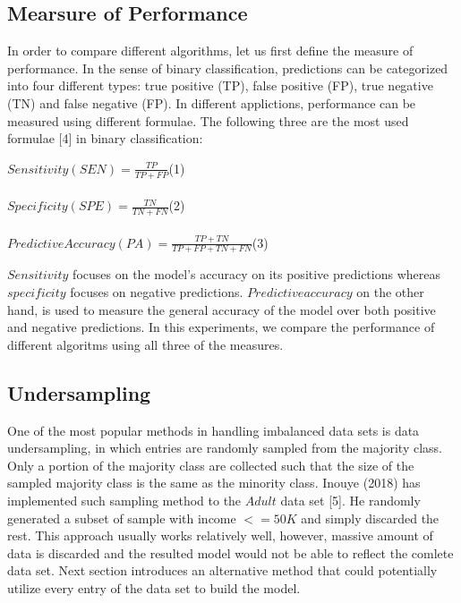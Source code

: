 \documentclass{article}
\begin{document}
\subsection{Mearsure of Performance}
\label{measure_of_performance}

In order to compare different algorithms, let us first define the measure of performance. In the sense of binary classification, predictions can be categorized into four different types: true positive (TP), false positive (FP), true negative (TN) and false negative (FP). In different applictions, performance can be measured using different formulae. The following three are the most used formulae [4] in binary classification:\\
\begin{center}
\hfill$Sensitivity (SEN)=\frac{TP}{TP+FP}$\hfill (1)\\\hfill\\
\hfill$Specificity (SPE)=\frac{TN}{TN+FN}$\hfill (2)\\\hfill\\
\hfill$Predictive Accuracy (PA)=\frac{TP+TN}{TP+FP+TN+FN}$\hfill (3)\\
\end{center}
$Sensitivity$ focuses on the model's accuracy on its positive predictions whereas $specificity$ focuses on negative predictions. $Predictive accuracy$ on the other hand, is used to measure the general accuracy of the model over both positive and negative predictions. In this experiments, we compare the performance of different algoritms using all three of the measures.

\subsection{Undersampling}
\label{undersampling}

One of the most popular methods in handling imbalanced data sets is data undersampling, in which entries are randomly sampled from the majority class. Only a portion of the majority class are collected such that the size of the sampled majority class is the same as the minority class. Inouye (2018) has implemented such sampling method to the $Adult$ data set [5]. He randomly generated a subset of sample with income $<=50K$ and simply discarded the rest. This approach usually works relatively well, however, massive amount of data is discarded and the resulted model would not be able to reflect the comlete data set. Next section introduces an alternative method that could potentially utilize every entry of the data set to build the model.
\end{document}
